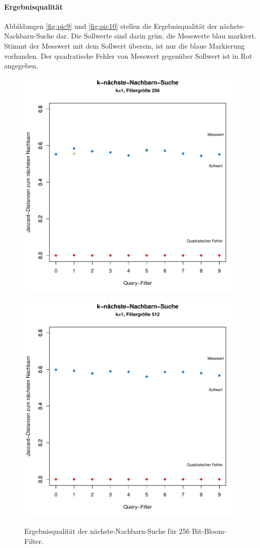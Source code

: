\paragraph*{Ergebnisqualität}
Abbildungen \ref{fig:pic9} und \ref{fig:pic10} stellen die Ergebnisqualität der nächste-Nachbarn-Suche dar. Die Sollwerte sind darin grün, die Messwerte blau markiert. Stimmt der Messwert mit dem Sollwert überein, ist nur die blaue Markierung vorhanden. Der quadratische Fehler von Messwert gegenüber Sollwert ist in Rot angegeben. 
\begin{figure}[hpbt]
	\centering
 	\includegraphics[scale=0.7]{pictures/nn_256.pdf}\\
  	\caption[Ergebnisqualität der nächste-Nachbarn-Suche für 256 Bit-Bloom-Filter]{Ergebnisqualität der nächste-Nachbarn-Suche für 256 Bit-Bloom-Filter.}\label{fig:pic8}
 	\includegraphics[scale=0.7]{pictures/nn_512.pdf}\\

\end{figure}
